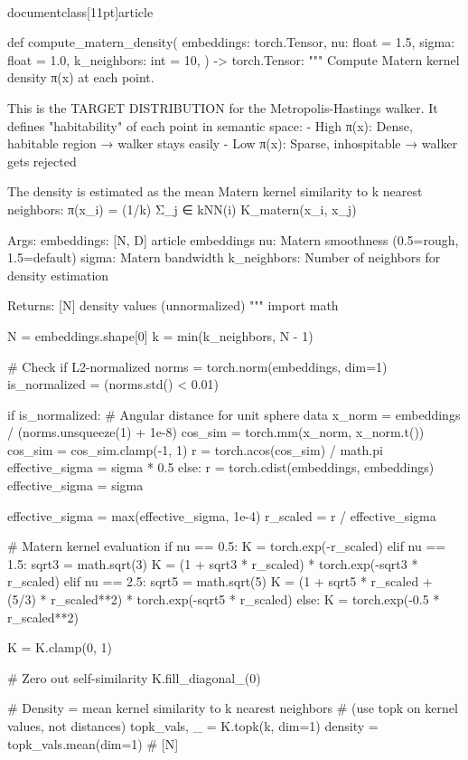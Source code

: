 \\documentclass[11pt]{article}
\begin{document}
\begin{CodeBlock}
def compute_matern_density(
    embeddings: torch.Tensor,
    nu: float = 1.5,
    sigma: float = 1.0,
    k_neighbors: int = 10,
) -> torch.Tensor:
    """
    Compute Matern kernel density π(x) at each point.

    This is the TARGET DISTRIBUTION for the Metropolis-Hastings walker.
    It defines "habitability" of each point in semantic space:
    - High π(x): Dense, habitable region → walker stays easily
    - Low π(x):  Sparse, inhospitable → walker gets rejected

    The density is estimated as the mean Matern kernel similarity to
    k nearest neighbors:
        π(x_i) = (1/k) Σ_{j ∈ kNN(i)} K_matern(x_i, x_j)

    Args:
        embeddings: [N, D] article embeddings
        nu: Matern smoothness (0.5=rough, 1.5=default)
        sigma: Matern bandwidth
        k_neighbors: Number of neighbors for density estimation

    Returns:
        [N] density values (unnormalized)
    """
    import math

    N = embeddings.shape[0]
    k = min(k_neighbors, N - 1)

    # Check if L2-normalized
    norms = torch.norm(embeddings, dim=1)
    is_normalized = (norms.std() < 0.01)

    if is_normalized:
        # Angular distance for unit sphere data
        x_norm = embeddings / (norms.unsqueeze(1) + 1e-8)
        cos_sim = torch.mm(x_norm, x_norm.t())
        cos_sim = cos_sim.clamp(-1, 1)
        r = torch.acos(cos_sim) / math.pi
        effective_sigma = sigma * 0.5
    else:
        r = torch.cdist(embeddings, embeddings)
        effective_sigma = sigma

    effective_sigma = max(effective_sigma, 1e-4)
    r_scaled = r / effective_sigma

    # Matern kernel evaluation
    if nu == 0.5:
        K = torch.exp(-r_scaled)
    elif nu == 1.5:
        sqrt3 = math.sqrt(3)
        K = (1 + sqrt3 * r_scaled) * torch.exp(-sqrt3 * r_scaled)
    elif nu == 2.5:
        sqrt5 = math.sqrt(5)
        K = (1 + sqrt5 * r_scaled + (5/3) * r_scaled**2) * torch.exp(-sqrt5 * r_scaled)
    else:
        K = torch.exp(-0.5 * r_scaled**2)

    K = K.clamp(0, 1)

    # Zero out self-similarity
    K.fill_diagonal_(0)

    # Density = mean kernel similarity to k nearest neighbors
    # (use topk on kernel values, not distances)
    topk_vals, _ = K.topk(k, dim=1)
    density = topk_vals.mean(dim=1)  # [N]


\end{CodeBlock}
\end{document}
